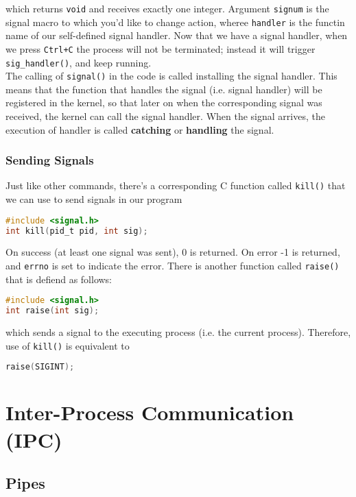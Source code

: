 \documentclass{article}
\newcommand{\bold}[1]{\textbf{#1}}
\newcommand{\code}[1]{\texttt{#1}}
\begin{document}
which returns \code{void} and receives exactly one integer. Argument \code{signum} is the signal macro to which you'd like to change action, wheree \code{handler} is the functin name of our self-defined signal handler. Now that we have a signal handler, when we press \code{Ctrl+C} the process will not be terminated; instead it will trigger \code{sig\_handler()}, and keep running. \\ 

The calling of \code{signal()} in the code is called installing the signal handler. This means that the function that handles the signal (i.e. signal handler) will be registered in the kernel, so that later on when the corresponding signal was received, the kernel can call the signal handler. When the signal arrives, the execution of handler is called \bold{catching} or \bold{handling} the signal. 

\subsubsection{Sending Signals}

Just like other commands, there's a corresponding C function called \code{kill()} that we can use to send signals in our program 

\begin{lstlisting}[language=C]
#include <signal.h>
int kill(pid_t pid, int sig);
\end{lstlisting}

On success (at least one signal was sent), 0 is returned. On error -1 is returned, and \code{errno} is set to indicate the error. There is another function called \code{raise()} that is defiend as follows:

\begin{lstlisting}[language=C]
#include <signal.h>
int raise(int sig);
\end{lstlisting}

which sends a signal to the executing process (i.e. the current process). Therefore, use of \code{kill()} is equivalent to 

\begin{lstlisting}[language=C]
raise(SIGINT);
\end{lstlisting}

\newpage
\section{Inter-Process Communication (IPC)}

\subsection{Pipes}
\end{document}
